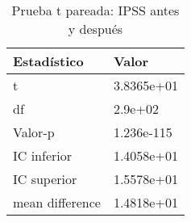 \begin{table}[ht]
\centering
\caption{Prueba t pareada: IPSS antes y después} 
\label{tab:prueba_t_ipss}
\begin{tabular}{ll}
  \hline
Estadístico & Valor \\ 
  \hline
t & 3.8365e+01 \\ 
  df & 2.9e+02 \\ 
  Valor-p & 1.236e-115 \\ 
  IC inferior & 1.4058e+01 \\ 
  IC superior & 1.5578e+01 \\ 
  mean difference & 1.4818e+01 \\ 
   \hline
\end{tabular}
\end{table}
